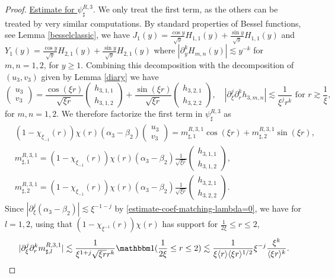 \documentclass[11 pt]{amsart}
\theoremstyle{definition}
\theoremstyle{remark}
\numberwithin{equation}{section}
\begin{document}
\begin{proof}
\noindent \underline{Estimate for $\psi_\sharp^{R,3}$}. We only treat the first term, as the others can be treated by very similar computations. By standard properties of Bessel functions, see Lemma \ref{besselclassic}, we have $J_1(y)=\frac{\cos y}{\sqrt{y}}H_{1,1}(y)+\frac{\sin y}{\sqrt{y}}H_{1,1}(y)$ and $Y_1(y)=\frac{\cos y}{\sqrt{y}}H_{2,1}(y)+\frac{\sin y}{\sqrt{y}}H_{2,1}(y)$ where $|\partial_y^k H_{m,n}(y)|\lesssim y^{-k}$ for $m,n=1,2$, for $y\geq 1$. Combining this decomposition with the decomposition of $(u_3,v_3)$ given by Lemma \ref{diary} we have
$$
\begin{pmatrix} u_3\\ v_3\end{pmatrix}=\frac{\cos (\xi r)}{\sqrt{\xi r}}\begin{pmatrix} h_{3,1,1}\\ h_{3,1,2}\end{pmatrix}+\frac{\sin (\xi r)}{\sqrt{\xi r}}\begin{pmatrix} h_{3,2,1}\\ h_{3,2,2}\end{pmatrix}, \quad \left|\partial_\xi^j\partial_r^k h_{3,m,n}\right|\lesssim \frac{1}{\xi^{j}r^k} \mbox{ for }r\gtrsim \frac{1}{\xi},
$$
for $m,n=1,2$. We therefore factorize the first term in $\psi_\sharp^{R,3}$ as
\begin{align*}
& (1-\chi_{\xi_{-1}}(r))\chi(r) (\alpha_3-\beta_2) \begin{pmatrix} u_3 \\ v_3 \end{pmatrix} = m^{R,3,1}_{\sharp,1}\cos(\xi r)+m^{R,3,1}_{\sharp,2}\sin(\xi r), \\
& m^{R,3,1}_{\sharp,1}=(1-\chi_{\xi_{-1}}(r))\chi(r) (\alpha_3-\beta_2)\frac{1}{\sqrt{\xi r}}\begin{pmatrix} h_{3,1,1}\\ h_{3,1,2}\end{pmatrix},\\
&m^{R,3,1}_{\sharp,2}=(1-\chi_{\xi_{-1}}(r))\chi(r) (\alpha_3-\beta_2)\frac{1}{\sqrt{\xi r}}\begin{pmatrix} h_{3,2,1}\\ h_{3,2,2}\end{pmatrix}.
\end{align*}
Since $|\partial_\xi^j(\alpha_3-\beta_2)|\lesssim \xi^{-1-j}$ by \eqref{estimate-coef-matching-lambda=0}, we have for $l=1,2$, using that $(1-\chi_{\xi^{-1}}(r))\chi(r)$ has support for $\frac{1}{2\xi}\leq r \leq 2$,
$$
|\partial_\xi^j \partial_r^k m^{R,3,1}_{\sharp,l}|\lesssim \frac{1}{\xi^{1+j} \sqrt{ \xi r} r^k}\mathbbm 1(\frac{1}{2\xi}\leq r \leq 2)\lesssim \frac{1}{\xi \langle r \rangle \langle \xi r \rangle^{1/2}} \xi^{- j} \frac{\xi^k}{\langle \xi r \rangle^k}.
$$
\end{proof}
\end{document}
